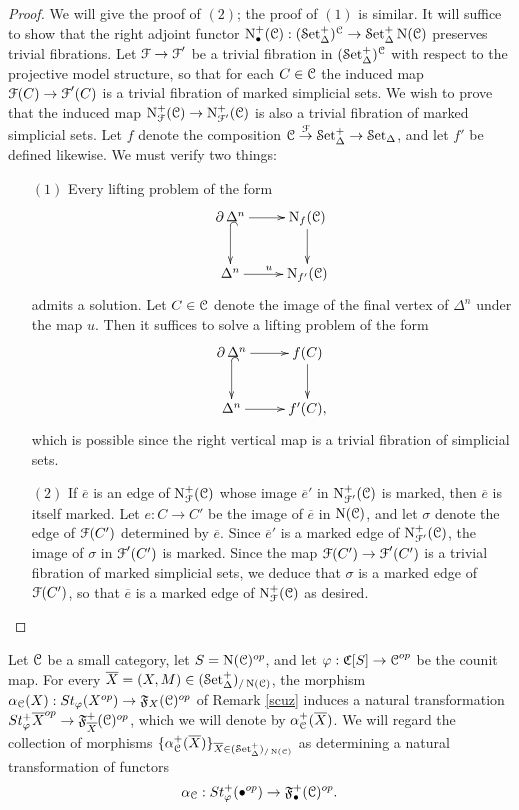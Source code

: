 \begin{proof}
We will give the proof of $(2)$; the proof of $(1)$ is similar. It will suffice to show that the right adjoint functor $\operatorname{N}^{+}_{\bullet}(\operatorname{\mathcal{C}}): (\operatorname{\mathcal{S}et_{\Delta}^{+}})^{\operatorname{\mathcal{C}}} \rightarrow \operatorname{\mathcal{S}et_{\Delta}^{+}}{ \operatorname{N}(\operatorname{\mathcal{C}}) }$ preserves trivial fibrations. Let $\operatorname{\mathcal{F}} \rightarrow \operatorname{\mathcal{F}}'$ be a trivial fibration in $(\operatorname{\mathcal{S}et_{\Delta}^{+}})^{\operatorname{\mathcal{C}}}$ with respect to the projective model structure, so that for each $C \in \operatorname{\mathcal{C}}$ the induced map $\operatorname{\mathcal{F}}(C) \rightarrow \operatorname{\mathcal{F}}'(C)$ is a trivial fibration of marked simplicial sets. We wish to prove that the induced map
$\operatorname{N}^{+}_{\operatorname{\mathcal{F}}}(\operatorname{\mathcal{C}}) \rightarrow \operatorname{N}^{+}_{\operatorname{\mathcal{F}}'}(\operatorname{\mathcal{C}})$ is also a trivial fibration of marked simplicial sets. Let $f$ denote the composition $\operatorname{\mathcal{C}} \stackrel{\operatorname{\mathcal{F}}}{\rightarrow} \operatorname{\mathcal{S}et_{\Delta}^{+}} \rightarrow \operatorname{\mathcal{S}et_{\Delta}}$, and let $f'$ be defined likewise. We must verify two things:
\begin{itemize}
\item[$(1)$] Every lifting problem of the form
$$ \xymatrix{ \bd \Delta^n \ar[r] \ar@{^{(}->}[d] & \Nerve_{f}(\calC) \ar[d] \\
\Delta^n \ar[r]^{u} & \Nerve_{f'}(\calC) }$$
admits a solution. Let $C \in \operatorname{\mathcal{C}}$ denote the image of the final vertex of $\Delta^n$ under the map $u$.
Then it suffices to solve a lifting problem of the form
$$ \xymatrix{ \bd \Delta^n \ar[r] \ar@{^{(}->}[d] & f(C) \ar[d] \\
\Delta^n \ar[r] & f'(C), }$$
which is possible since the right vertical map is a trivial fibration of simplicial sets.

\item[$(2)$] If $\overline{e}$ is an edge of $\operatorname{N}^{+}_{\operatorname{\mathcal{F}}}(\operatorname{\mathcal{C}})$ whose image $\overline{e}'$ in
$\operatorname{N}^{+}_{\operatorname{\mathcal{F}}'}(\operatorname{\mathcal{C}})$ is marked, then $\overline{e}$ is itself marked. Let
$e: C \rightarrow C'$ be the image of $\overline{e}$ in $\operatorname{N}(\operatorname{\mathcal{C}})$, and let
$\sigma$ denote the edge of $\operatorname{\mathcal{F}}(C')$ determined by $\overline{e}$. Since
$\overline{e}'$ is a marked edge of $\operatorname{N}^{+}_{\operatorname{\mathcal{F}}'}(\operatorname{\mathcal{C}})$, the image of
$\sigma$ in $\operatorname{\mathcal{F}}'(C')$ is marked. Since the map $\operatorname{\mathcal{F}}(C') \rightarrow \operatorname{\mathcal{F}}'(C')$ is a trivial fibration of marked simplicial sets, we deduce that $\sigma$ is a marked edge of $\operatorname{\mathcal{F}}(C')$, so that
$\overline{e}$ is a marked edge of $\operatorname{N}^{+}_{\operatorname{\mathcal{F}}}(\operatorname{\mathcal{C}})$ as desired.
\end{itemize}
\end{proof}

\begin{remark}\label{scuz2}
Let $\operatorname{\mathcal{C}}$ be a small category, let $S = \operatorname{N}(\operatorname{\mathcal{C}})^{op}$, and let $\varphi: \operatorname{\mathfrak{C}}[S] \rightarrow \operatorname{\mathcal{C}}^{op}$ be the counit map. For every $\overline{X} = (X,M) \in (\operatorname{\mathcal{S}et}^{+}_{\Delta})_{/\operatorname{N}(\operatorname{\mathcal{C}})}$, the 
morphism $\alpha_{\operatorname{\mathcal{C}}}(X): St_{\varphi}(X^{op}) \rightarrow {\mathfrak F}_{X}(\operatorname{\mathcal{C}})^{op}$ of Remark \ref{scuz} induces a natural transformation $St^{+}_{\varphi} \overline{X}^{op} \rightarrow {\mathfrak F}^{+}_{ \overline{X}}(\operatorname{\mathcal{C}})^{op}$, which we will denote by $\alpha^{+}_{\operatorname{\mathcal{C}}}( \overline{X})$. We will regard the collection
of morphisms $\{ \alpha^{+}_{\operatorname{\mathcal{C}}}( \overline{X}) \}_{ \overline{X} \in (\operatorname{\mathcal{S}et}^{+}_{\Delta})_{/\operatorname{N}(\operatorname{\mathcal{C}})}}$ as determining a natural transformation of functors 
$$\alpha_{\operatorname{\mathcal{C}}}: St^{+}_{\varphi}( \bullet^{op}) \rightarrow {\mathfrak F}^{+}_{\bullet}(\operatorname{\mathcal{C}})^{op}.$$
\end{remark}

